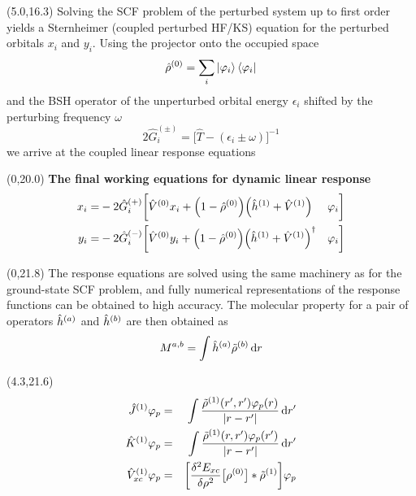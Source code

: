 \documentclass[a0,portrait]{a0poster}
\begin{document}
\begin{textblock}{4.3}(5.0,16.3)
Solving the SCF problem of the perturbed system up to first order yields a
Sternheimer\cite{Mahan} (coupled perturbed HF/KS) equation for the perturbed 
orbitals $x_i$ and $y_i$. Using the projector onto the occupied space
\begin{equation}
    \hat{\rho}^{(0)} = \sum_i \ket{\varphi_i}\bra{\varphi_i}
\end{equation}
and the BSH operator of the unperturbed orbital energy $\epsilon_i$ shifted by 
the perturbing frequency $\omega$
\begin{equation}
    2\hat{G}_i^{(\pm)} = \Big[\hat{T} - (\epsilon_i \pm \omega)\Big]^{-1} 
\end{equation}
we arrive at the coupled linear response equations\cite{Sekino,Yanai}
\end{textblock}

\begin{textblock}{9.3}(0,20.0)
\centering
\textbf{The final working equations for dynamic linear response}
\begin{eqnarray}
    \label{eq:x}
    x_i =& -2 \hat{G}_i^{(+)}\bigg[
    \hat{V}^{(0)}x_i +
    \Big(1 - \hat{\rho}^{(0)}\Big)
    \Big(\hat{h}^{(1)} + \hat{V}^{(1)}\Big)&\varphi_i\bigg]\\
    \label{eq:y}
    y_i =& -2 \hat{G}_i^{(-)}\bigg[
    \hat{V}^{(0)}y_i +
    \Big(1 - \hat{\rho}^{(0)}\Big)
    \Big(\hat{h}^{(1)} + \hat{V}^{(1)}\Big)^\dag&\varphi_i\bigg]
\end{eqnarray}
\end{textblock}

\begin{textblock}{4.3}(0,21.8)
The response equations are solved using the same machinery as for the 
ground-state SCF problem, and fully numerical representations of the response
functions can be obtained to high accuracy. 
The molecular property for a pair of operators 
$\hat{h}^{(a)}$ and $\hat{h}^{(b)}$ are then obtained as
\begin{equation}
    M^{a,b} = \int \hat{h}^{(a)}\tilde{\rho}^{(b)} \,\mathrm{d} r
\end{equation}
\end{textblock}

\begin{textblock}{5.0}(4.3,21.6)
\begin{eqnarray}
    \hat{J}^{(1)} \varphi_p &=& 
        \int\frac{\tilde{\rho}^{(1)}(r',r')\varphi_p(r)}{|r-r'|} \,\mathrm{d} r' \\
    \hat{K}^{(1)} \varphi_p &=&
        \int\frac{\tilde{\rho}^{(1)}(r,r')\varphi_p(r')}{|r-r'|} \,\mathrm{d} r' \\
    \hat{V}_{xc}^{(1)} \varphi_p &=& 
        \bigg[\frac{\delta^2 E_{xc}}{\delta \rho^2}
        \big[\rho^{(0)}\big]*\tilde{\rho}^{(1)}\bigg] \varphi_p
\end{eqnarray}
\end{textblock}
\end{document}
